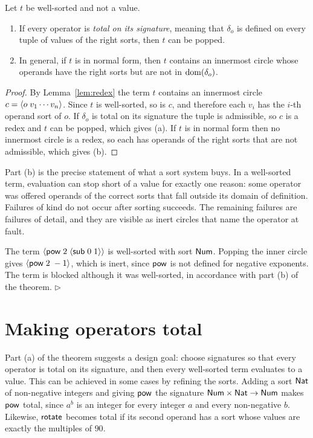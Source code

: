\begin{theorem}\label{thm:progress}
Let $t$ be well-sorted and not a value.
\begin{enumerate}[label=(\alph*)]
\item If every operator is \emph{total on its signature}, meaning that $\delta_o$ is defined on every tuple of values of the right sorts, then $t$ can be popped.
\item In general, if $t$ is in normal form, then $t$ contains an innermost circle whose operands have the right sorts but are not in $\operatorname{dom}(\delta_o)$.
\end{enumerate}
\end{theorem}
\begin{proof}
By Lemma~\ref{lem:redex} the term $t$ contains an innermost circle $c=\langle o\; v_1\cdots v_n\rangle$. Since $t$ is well-sorted, so is $c$, and therefore each $v_i$ has the $i$-th operand sort of $o$. If $\delta_o$ is total on its signature the tuple is admissible, so $c$ is a redex and $t$ can be popped, which gives (a). If $t$ is in normal form then no innermost circle is a redex, so each has operands of the right sorts that are not admissible, which gives (b).
\end{proof}

Part (b) is the precise statement of what a sort system buys. In a well-sorted term, evaluation can stop short of a value for exactly one reason: some operator was offered operands of the correct sorts that fall outside its domain of definition. Failures of kind do not occur after sorting succeeds. The remaining failures are failures of detail, and they are visible as inert circles that name the operator at fault.

\begin{example}
The term $\langle \mathsf{pow}\; 2\; \langle \mathsf{sub}\; 0\; 1\rangle\rangle$ is well-sorted with sort $\mathsf{Num}$. Popping the inner circle gives $\langle \mathsf{pow}\; 2\; -1\rangle$, which is inert, since $\mathsf{pow}$ is not defined for negative exponents. The term is blocked although it was well-sorted, in accordance with part (b) of the theorem. \hfill$\triangleright$
\end{example}

\section{Making operators total}

Part (a) of the theorem suggests a design goal: choose signatures so that every operator is total on its signature, and then every well-sorted term evaluates to a value. This can be achieved in some cases by refining the sorts. Adding a sort $\mathsf{Nat}$ of non-negative integers and giving $\mathsf{pow}$ the signature $\mathsf{Num}\times\mathsf{Nat}\to\mathsf{Num}$ makes $\mathsf{pow}$ total, since $a^{b}$ is an integer for every integer $a$ and every non-negative $b$. Likewise, $\mathsf{rotate}$ becomes total if its second operand has a sort whose values are exactly the multiples of $90$.

